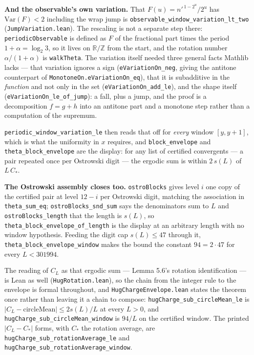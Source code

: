 \documentclass[12pt]{article}
\begin{document}
\textbf{And the observable's own variation.} That
\(F(u)=n'^{\,1-2^u}/2^u\) has \(\mathrm{Var}(F)<2\) including the wrap
jump is \texttt{\nolinkurl{observable_window_variation_lt_two}}
(\texttt{\nolinkurl{JumpVariation.lean}}). The rescaling is not a
separate step there: \texttt{\nolinkurl{periodicObservable}} is defined
as \(F\) of the fractional part times the period \(1+\alpha=\log_2 3\),
so it lives on \(\mathbb R/\mathbb Z\) from the start, and the rotation
number \(\alpha/(1+\alpha)\) is \texttt{\nolinkurl{walkTheta}}. The
variation itself needed three general facts Mathlib lacks --- that
variation ignores a sign (\texttt{\nolinkurl{eVariationOn_neg}}, giving
the antitone counterpart of
\texttt{\nolinkurl{MonotoneOn.eVariationOn_eq}}), that it is subadditive
in the \emph{function} and not only in the set
(\texttt{\nolinkurl{eVariationOn_add_le}}), and the shape itself
(\texttt{\nolinkurl{eVariationOn_le_of_jump}}): a fall, plus a jump, and
the proof is a decomposition \(f=g+h\) into an antitone part and a
monotone step rather than a computation of the supremum.

\texttt{\nolinkurl{periodic_window_variation_le}} then reads that off
for \emph{every} window \([y,y+1]\), which is what the uniformity in
\(x\) requires, and \texttt{\nolinkurl{block_envelope}} and
\texttt{\nolinkurl{theta_block_envelope}} are the display: for any list
of certified convergents --- a pair repeated once per Ostrowski digit
--- the ergodic sum is within \(2\,s(L)\) of \(L\,C_*\).

\textbf{The Ostrowski assembly closes too.}
\texttt{\nolinkurl{ostroBlocks}} gives level \(i\) one copy of the
certified pair at level \(12-i\) per Ostrowski digit, matching the
association in \texttt{\nolinkurl{theta_sum_eq}};
\texttt{\nolinkurl{ostroBlocks_snd_sum}} says the denominators sum to
\(L\) and \texttt{\nolinkurl{ostroBlocks_length}} that the length is
\(s(L)\), so \texttt{\nolinkurl{theta_block_envelope_of_length}} is the
display at an arbitrary length with no window hypothesis. Feeding the
digit cap \(s(L)\le47\) through it,
\texttt{\nolinkurl{theta_block_envelope_window}} makes the bound the
constant \(94=2\cdot47\) for every \(L<301994\).

The reading of \(C_L\) as that ergodic sum --- Lemma 5.6's rotation
identification --- is Lean as well
(\texttt{\nolinkurl{HugRotation.lean}}), so the chain from the integer
rule to the envelope is formal throughout, and
\texttt{\nolinkurl{HugChargeEnvelope.lean}} states the theorem once
rather than leaving it a chain to compose:
\texttt{\nolinkurl{hugCharge_sub_circleMean_le}} is
\(|C_L-\mathrm{circleMean}|\le 2s(L)/L\) at every \(L>0\), and
\texttt{\nolinkurl{hugCharge_sub_circleMean_window}} is \(94/L\) on the
certified window. The printed \(|C_L-C_*|\) forms, with \(C_*\) the
rotation average, are
\texttt{\nolinkurl{hugCharge_sub_rotationAverage_le}} and
\texttt{\nolinkurl{hugCharge_sub_rotationAverage_window}}.
\end{document}
